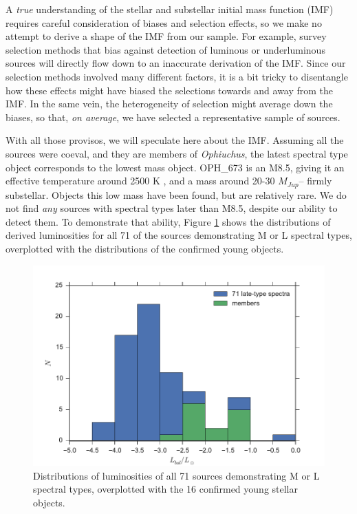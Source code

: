 A \emph{true} understanding of the stellar and substellar initial mass function (IMF) requires careful consideration of biases and selection effects, so we make no attempt to derive a shape of the IMF from our sample.  For example, survey selection methods that bias against detection of luminous or underluminous sources will directly flow down to an inaccurate derivation of the IMF.  Since our selection methods involved many different factors, it is a bit tricky to disentangle how these effects might have biased the selections towards and away from the IMF.  In the same vein, the heterogeneity of selection might average down the biases, so that, \emph{on average}, we have selected a representative sample of sources.

With all those provisos, we will speculate here about the IMF.  Assuming all the sources were coeval, and they are members of \emph{Ophiuchus}, the latest spectral type object corresponds to the lowest mass object.  OPH\_673 is an M8.5, giving it an effective temperature around 2500 K \citep{2003ApJ...593.1093L}, and a mass around 20-30 $M_{Jup}$-- firmly substellar.  Objects this low mass have been found, but are relatively rare.  We do not find \emph{any} sources with spectral types later than M8.5, despite our ability to detect them.  To demonstrate that ability, Figure \ref{fig_luminosity_dist} shows the distributions of derived luminosities for all 71 of the sources demonstrating M or L spectral types, overplotted with the distributions of the confirmed young objects.

\begin{figure}[ht!]
  \caption{ Distributions of luminosities of all 71 sources demonstrating M or L spectral types, overplotted with the 16 confirmed young stellar objects. \label{fig_luminosity_dist} }
\centering
\includegraphics[scale=0.6]{chIMACS/figures/luminosity_histogram}
\end{figure}


